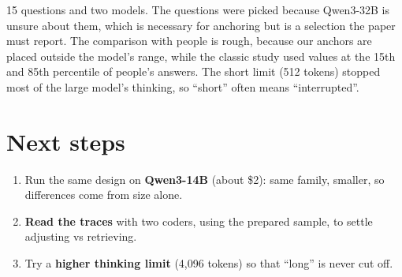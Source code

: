 \documentclass[11pt,a4paper]{article}
\begin{document}
\begin{cautionbox}[Limits.]
15 questions and two models. The questions were picked because Qwen3-32B is unsure about them, which is necessary for anchoring but is a selection the paper must report. The comparison with people is rough, because our anchors are placed outside the model's range, while the classic study used values at the 15th and 85th percentile of people's answers. The short limit (512 tokens) stopped most of the large model's thinking, so \enquote{short} often means \enquote{interrupted}.
\end{cautionbox}

\section{Next steps}
\begin{enumerate}[leftmargin=*]
  \item Run the same design on \textbf{Qwen3-14B} (about \$2): same family, smaller, so differences come from size alone.
  \item \textbf{Read the traces} with two coders, using the prepared sample, to settle adjusting vs retrieving.
  \item Try a \textbf{higher thinking limit} (4,096 tokens) so that \enquote{long} is never cut off.
\end{enumerate}

\appendix
\end{document}
